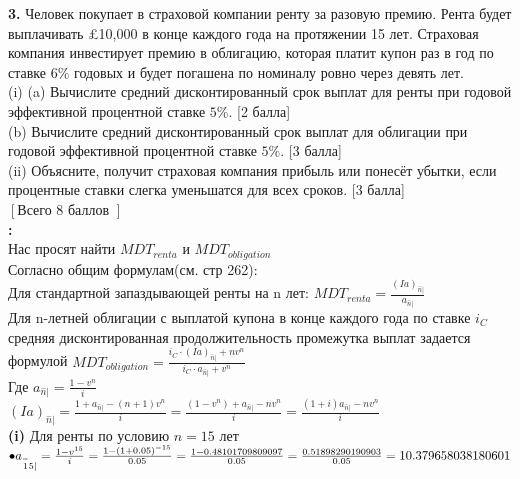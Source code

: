\documentclass{article}
\begin{document}
{\bf \large 3.} Человек покупает в страховой компании ренту за разовую премию. Рента будет выплачивать \pounds10,000 в конце каждого года на протяжении 15 лет. Страховая компания инвестирует премию в облигацию, которая платит купон раз в год по ставке $6\%$ годовых и будет погашена по номиналу ровно через девять лет.\\
(i) (a) Вычислите средний дисконтированный срок выплат для ренты при годовой эффективной процентной ставке $5\%.$  [2 балла]\\
(b) Вычислите средний дисконтированный срок выплат для облигации при годовой эффективной процентной ставке $5\%.$ [3 балла]\\
(ii) Объясните, получит страховая компания прибыль или понесёт убытки, если процентные ставки слегка уменьшатся для всех сроков. [3 балла]\\
$\left[\right. $Всего 8 баллов $\left.\right]$\\

{\bf {}:}\\
Нас просят найти $MDT_{renta}$ и $MDT_{obligation}$\\

Согласно общим формулам(см. стр 262):\\

Для стандартной запаздывающей ренты на n лет: $ \boxed  {  MDT_{renta} = \frac {(Ia)_{\overset{-}n | }}   { a_{\overset{-}n | } }   }  $\\
Для  n-летней облигации с выплатой купона в конце каждого года по ставке $i_C$ средняя дисконтированная продолжительность промежутка выплат задается формулой $   \boxed  {   MDT_{obligation} = \frac {i_C \cdot  (Ia)_{\overset{-}n | }    + n v^n} { i_C  \cdot a_{\overset{-}n | }  + v^n }  }$\\

Где $  \boxed { a_{\overset{-}n | }  = \frac {1 - v^n} {i} } $\\

$  \boxed { {(Ia)_{\overset{-}n | }} =  \frac {1 + a_{\overset{-}n | }  -(n+1)v^n } {i}  = \frac {(1-v^n) + a_{\overset{-}n | }  -n v^n } {i}   =   \frac {(1+i) a_{\overset{-}n | }  -n v^n } {i} } $ \\


{\bf \large  (i)} 
Для ренты по условию $n=15$ лет\\

$ \bullet  a_{\overset{-}15 | }  = \frac {1 - v^{15}} {i}= \frac {1 - (1+0.05)^{-15}} {0.05} \\
=  \frac {1 -  0.48101709809097} {0.05} =  \frac {0.51898290190903} {0.05} = 10.379658038180601$\\
\end{document}
